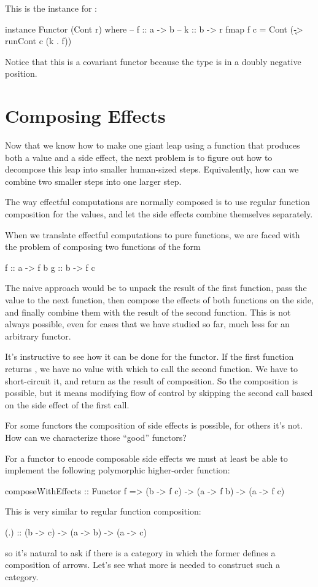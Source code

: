\documentclass[DaoFP]{subfiles}
\begin{document}
This is the  instance for :
\begin{haskell}
instance Functor (Cont r) where
  -- f :: a -> b
  -- k :: b -> r
  fmap f c = Cont (\k -> runCont c (k . f))
\end{haskell}
Notice that this is a covariant functor because the type  is in a doubly negative position.

\section{Composing Effects}

Now that we know how to make one giant leap using a function that produces both a value and a side effect, the next problem is to figure out how to decompose this leap into smaller human-sized steps. Equivalently, how can we combine two smaller steps into one larger step. 

The way effectful computations are normally composed is to use regular function composition for the values, and let the side effects combine themselves separately. 

When we translate effectful computations to pure functions, we are faced with the problem of composing two functions of the form
\begin{haskell}
f :: a -> f b
g :: b -> f c
\end{haskell}

The naive approach would be to unpack the result of the first function, pass the value to the next function, then compose the effects of both functions on the side, and finally combine them with the result of the second function. This is not always possible, even for cases that we have studied so far, much less for an arbitrary functor.

It's instructive to see how it can be done for the  functor. If the first function returns , we have no value with which to call the second function. We have to short-circuit it, and return  as the result of composition. So the composition is possible, but it means modifying flow of control by skipping the second call based on the side effect of the first call. 

For some functors the composition of side effects is possible, for others it's not. How can we characterize those ``good'' functors?

For a functor to encode composable side effects we must at least be able to implement the following polymorphic higher-order function: 
\begin{haskell}
composeWithEffects :: Functor f => 
       (b -> f c) -> (a -> f b) -> (a -> f c)
\end{haskell}
This is very similar to regular function composition:
\begin{haskell}
(.) :: (b -> c) -> (a -> b) -> (a -> c)
\end{haskell}
so it's natural to ask if there is a category in which the former defines a composition of arrows. Let's see what more is needed to construct such a category.
\end{document}
